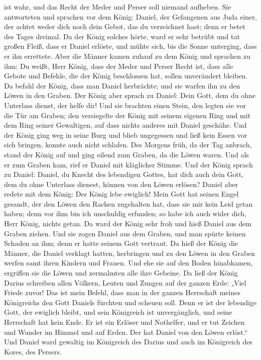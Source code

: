 ist wahr, und das Recht der Meder und Perser soll niemand aufheben.
 Sie antworteten und sprachen vor dem König: Daniel, der
Gefangenen aus Juda einer, der achtet weder dich noch dein Gebot, das du
verzeichnet hast; denn er betet des Tages dreimal.  Da
der König solches hörte, ward er sehr betrübt und tat großen Fleiß, dass
er Daniel erlöste, und mühte sich, bis die Sonne unterging, dass er ihn
errettete.  Aber die Männer kamen zuhauf zu dem König und
sprachen zu ihm: Du weißt, Herr König, dass der Meder und Perser Recht
ist, dass alle Gebote und Befehle, die der König beschlossen hat, sollen
unverändert bleiben.  Da befahl der König, dass man
Daniel herbrächte; und sie warfen ihn zu den Löwen in den Graben. Der
König aber sprach zu Daniel: Dein Gott, dem du ohne Unterlass dienst,
der helfe dir!  Und sie brachten einen Stein, den legten
sie vor die Tür am Graben; den versiegelte der König mit seinem eigenen
Ring und mit dem Ring seiner Gewaltigen, auf dass nichts anderes mit
Daniel geschähe.  Und der König ging weg in seine Burg
und blieb ungegessen und ließ kein Essen vor sich bringen, konnte auch
nicht schlafen.  Des Morgens früh, da der Tag anbrach,
stand der König auf und ging eilend zum Graben, da die Löwen waren.
 Und als er zum Graben kam, rief er Daniel mit kläglicher
Stimme. Und der König sprach zu Daniel: Daniel, du Knecht des lebendigen
Gottes, hat dich auch dein Gott, dem du ohne Unterlass dienest, können
von den Löwen erlösen?  Daniel aber redete mit dem König:
Der König lebe ewiglich!  Mein Gott hat seinen Engel
gesandt, der den Löwen den Rachen zugehalten hat, dass sie mir kein Leid
getan haben; denn vor ihm bin ich unschuldig erfunden; so habe ich auch
wider dich, Herr König, nichts getan.  Da ward der König
sehr froh und hieß Daniel aus dem Graben ziehen. Und sie zogen Daniel
aus dem Graben, und man spürte keinen Schaden an ihm; denn er hatte
seinem Gott vertraut.  Da hieß der König die Männer, die
Daniel verklagt hatten, herbringen und zu den Löwen in den Graben werfen
samt ihren Kindern und Frauen. Und ehe sie auf den Boden hinabkamen,
ergriffen sie die Löwen und zermalmten alle ihre Gebeine.
 Da ließ der König Darius schreiben allen Völkern, Leuten
und Zungen auf der ganzen Erde: „Viel Friede zuvor!  Das
ist mein Befehl, dass man in der ganzen Herrschaft meines Königreichs
den Gott Daniels fürchten und scheuen soll. Denn er ist der lebendige
Gott, der ewiglich bleibt, und sein Königreich ist unvergänglich, und
seine Herrschaft hat kein Ende.  Er ist ein Erlöser und
Nothelfer, und er tut Zeichen und Wunder im Himmel und auf Erden. Der
hat Daniel von den Löwen erlöst.``  Und Daniel ward
gewaltig im Königreich des Darius und auch im Königreich des Kores, des
Persers.

